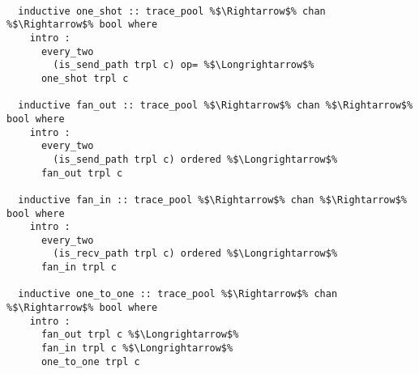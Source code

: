 \begin{lstlisting}[style=codestyle1, escapechar=\%]

  inductive one_shot :: trace_pool %$\Rightarrow$% chan %$\Rightarrow$% bool where
    intro :
      every_two
        (is_send_path trpl c) op= %$\Longrightarrow$% 
      one_shot trpl c

  inductive fan_out :: trace_pool %$\Rightarrow$% chan %$\Rightarrow$% bool where
    intro :
      every_two
        (is_send_path trpl c) ordered %$\Longrightarrow$%
      fan_out trpl c

  inductive fan_in :: trace_pool %$\Rightarrow$% chan %$\Rightarrow$% bool where
    intro :
      every_two
        (is_recv_path trpl c) ordered %$\Longrightarrow$% 
      fan_in trpl c

  inductive one_to_one :: trace_pool %$\Rightarrow$% chan %$\Rightarrow$% bool where
    intro :
      fan_out trpl c %$\Longrightarrow$%
      fan_in trpl c %$\Longrightarrow$% 
      one_to_one trpl c

  \end{lstlisting}


